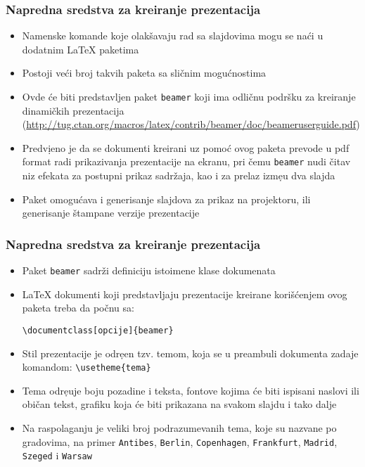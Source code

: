 \documentclass{beamer}
\begin{document}
\begin{frame}[fragile]\frametitle{Napredna sredstva za kreiranje prezentacija}
	\begin{itemize}	
		\item Namenske komande koje olakšavaju rad sa slajdovima mogu se naći u dodatnim \LaTeX{} paketima		
		\item Postoji veći broj takvih paketa sa sličnim mogućnostima		
		\item Ovde će biti predstavljen paket \verb"beamer" koji ima odličnu podršku za kreiranje
		dinamičkih prezentacija \footnotesize (\url{http://tug.ctan.org/macros/latex/contrib/beamer/doc/beameruserguide.pdf}) \normalsize		
		\item Predvi\d{}eno je da se dokumenti kreirani uz pomoć ovog paketa prevode u pdf
		format radi prikazivanja prezentacije na ekranu, pri čemu
		\verb"beamer" nudi čitav niz efekata za postupni prikaz sadržaja, kao i za prelaz izme\d{}u dva slajda		
		\item Paket omogućava i generisanje slajdova za prikaz na
		projektoru, ili generisanje štampane verzije prezentacije
	\end{itemize}
\end{frame}

\begin{frame}[fragile]\frametitle{Napredna sredstva za kreiranje prezentacija}
	\begin{itemize}	
		\item Paket \verb"beamer" sadrži definiciju istoimene klase dokumenata		
		\item \LaTeX{} dokumenti koji predstavljaju prezentacije kreirane korišćenjem ovog paketa treba da
		počnu sa:
		
		\verb"\documentclass[opcije]{beamer}"
		
		\item Stil prezentacije je odre\d{}en tzv. temom, koja se u preambuli dokumenta
		zadaje komandom: \verb"\usetheme{tema}"		
		\item Tema odre\d{}uje boju pozadine i teksta, fontove kojima će biti
		ispisani naslovi ili običan tekst, grafiku koja će biti prikazana na svakom slajdu
		i tako dalje		
		\item Na raspolaganju je veliki broj podrazumevanih tema, koje su nazvane po gradovima,
		na primer \verb"Antibes", \verb"Berlin", \verb"Copenhagen", \verb"Frankfurt", \verb"Madrid", \verb"Szeged" i \verb"Warsaw"
	\end{itemize}
\end{frame}
\end{document}
